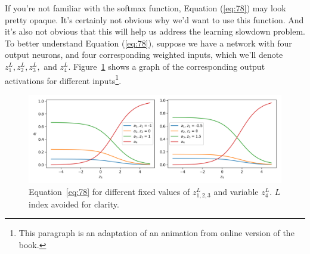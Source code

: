 \documentclass[a4paper,twoside,10pt]{book}
\begin{document}
If you're not familiar with the softmax function, Equation (\ref{eq:78}) may look pretty opaque. It's certainly not obvious why we'd want to use this function. And it's also not obvious that this will help us address the learning slowdown problem. To better understand Equation (\ref{eq:78}), suppose we have a network with four output neurons, and four corresponding weighted inputs, which we'll denote $z^L_1,z^L_2,z^L_3,$ and $z^L_4$. Figure~\ref{fig:softmax} shows  a graph of the corresponding output activations for different inputs\footnote{This paragraph is an adaptation of an animation from online version of the book.}.
\begin{figure}
\includegraphics[width=\linewidth]{./figures/ch3/animation_softmax}
\caption{Equation~\ref{eq:78} for different fixed values of $z^L_{1,2,3}$ and variable $z^L_4$. $L$ index avoided for clarity. }
\label{fig:softmax}
\end{figure}
\end{document}
